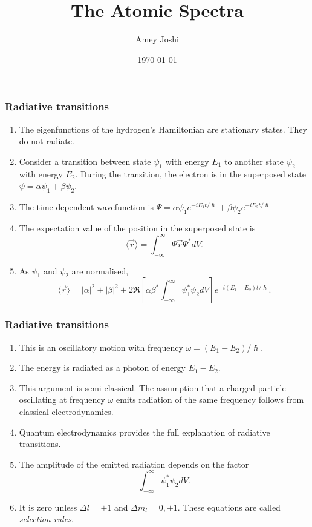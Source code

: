 \documentclass{beamer}
\title{The Atomic Spectra}
\author{Amey Joshi}
\date{\today}
\begin{document}
\begin{frame}
\titlepage
\end{frame}

\begin{frame}
\frametitle{Radiative transitions}
\begin{enumerate}
\item The eigenfunctions of the hydrogen's Hamiltonian are stationary states.
They do not radiate.
\item Consider a transition between state $\psi_1$ with energy $E_1$ to another
state $\psi_2$ with energy $E_2$. During the transition, the electron is in the
superposed state $\psi = \alpha\psi_1 + \beta\psi_2$.
\item The time dependent wavefunction is $\Psi = \alpha\psi_1 e^{-iE_1t/\hslash}
+ \beta\psi_2 e^{-iE_2t/\hslash}$
\item The expectation value of the position in the superposed state is
\begin{equation}\label{e1}
\langle\vec{r}\rangle = \int_{-\infty}^\infty \Psi\vec{r}\Psi^\ast dV.
\end{equation}
\item As $\psi_1$ and $\psi_2$ are normalised,
\begin{equation}\label{e2}
\langle\vec{r}\rangle = |\alpha|^2 + |\beta|^2 + 2\Re\left[\alpha\beta^\ast
\int_{-\infty}^\infty\psi_1^\ast\psi_2 dV\right]e^{-i(E_1 - E_2)t/\hslash}.
\end{equation}
\end{enumerate}
\end{frame}

\begin{frame}
\frametitle{Radiative transitions}
\begin{enumerate}
\item This is an oscillatory motion with frequency $\omega = (E_1-E_2)/\hslash$.
\item The energy is radiated as a photon of energy $E_1 - E_2$.
\item This argument is semi-classical. The assumption that a charged particle
oscillating at frequency $\omega$ emits radiation of the same frequency follows
from classical electrodynamics.
\item Quantum electrodynamics provides the full explanation of radiative 
transitions.
\item The amplitude of the emitted radiation depends on the factor
\begin{equation}\label{e3}
\int_{-\infty}^\infty\psi_1^\ast\psi_2 dV.
\end{equation}
\item It is zero unless $\Delta l = \pm 1$ and $\Delta m_l = 0, \pm 1$. These
equations are called \emph{selection rules}.
\end{enumerate}
\end{frame}
\end{document}

